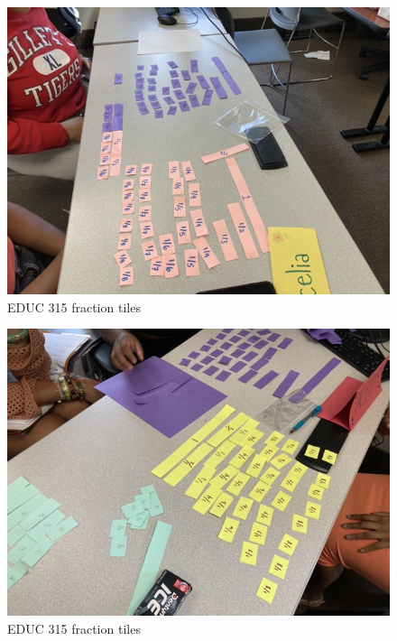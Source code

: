 \documentclass[
  letterpaper,
  DIV=11,
  numbers=noendperiod]{scrartcl}
\begin{document}
\begin{figure}[H]

{\centering \includegraphics{../img/mod03/fraction-tiles-1.jpeg}

}

\caption{EDUC 315 fraction tiles}

\end{figure}%
\begin{figure}[H]

{\centering \includegraphics{../img/mod03/fraction-tiles-2.jpeg}

}

\caption{EDUC 315 fraction tiles}

\end{figure}%
\end{document}
